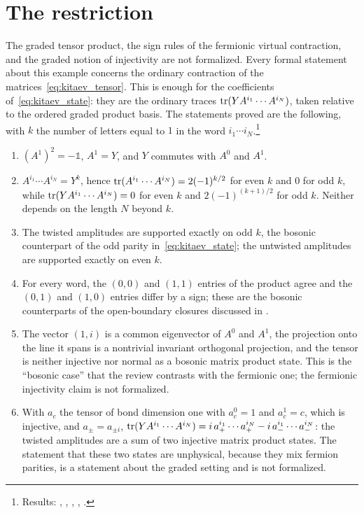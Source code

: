 \documentclass{article}
\begin{document}
\section{The restriction}
The graded tensor product, the sign rules of the fermionic virtual
contraction, and the graded notion of injectivity are not formalized. Every
formal statement about this example concerns the ordinary contraction of the
matrices~\eqref{eq:kitaev_tensor}. This is enough for the coefficients
of~\eqref{eq:kitaev_state}: they are the ordinary traces $\operatorname{tr}(YA^{i_1}\cdots
A^{i_N})$, taken relative to the ordered graded product basis. The statements
proved are the following, with $k$ the number of letters equal to $1$ in the
word $i_1\cdots i_N$.\footnote{Results: ,
    ,
    ,
    ,
    .}
\begin{enumerate}
    \item $(A^1)^2=-\mathbb 1$, $A^1=Y$, and $Y$ commutes with $A^0$ and $A^1$.
    \item $A^{i_1}\cdots A^{i_N}=Y^k$, hence
    $\operatorname{tr}(A^{i_1}\cdots A^{i_N})=2(-1)^{k/2}$ for even $k$ and $0$ for odd $k$,
    while $\operatorname{tr}(YA^{i_1}\cdots A^{i_N})=0$ for even $k$ and $2(-1)^{(k+1)/2}$
    for odd $k$. Neither depends on the length $N$ beyond $k$.
    \item The twisted amplitudes are supported exactly on odd $k$, the
    bosonic counterpart of the odd parity in~\eqref{eq:kitaev_state}; the
    untwisted amplitudes are supported exactly on even $k$.
    \item For every word, the $(0,0)$ and $(1,1)$ entries of the product agree
    and the $(0,1)$ and $(1,0)$ entries differ by a sign; these are the
    bosonic counterparts of the open-boundary closures discussed in
    \cite{Bultinck2017FermionicMPS}.
    \item The vector $(1,i)$ is a common eigenvector of $A^0$ and $A^1$, the
    projection onto the line it spans is a nontrivial invariant orthogonal
    projection, and the tensor is neither injective nor normal as a bosonic
    matrix product state. This is the ``bosonic case'' that the review
    contrasts with the fermionic one; the fermionic injectivity claim is not
    formalized.
    \item With $a_c$ the tensor of bond dimension one with $a_c^0=1$ and
    $a_c^1=c$, which is injective, and $a_\pm=a_{\pm i}$,
    $\operatorname{tr}(YA^{i_1}\cdots A^{i_N})
    =i\,a_+^{i_1}\cdots a_+^{i_N}-i\,a_-^{i_1}\cdots a_-^{i_N}$: the
    twisted amplitudes are a sum of two injective matrix product states. The
    statement that these two states are unphysical, because they mix fermion
    parities, is a statement about the graded setting and is not formalized.
\end{enumerate}
\end{document}
